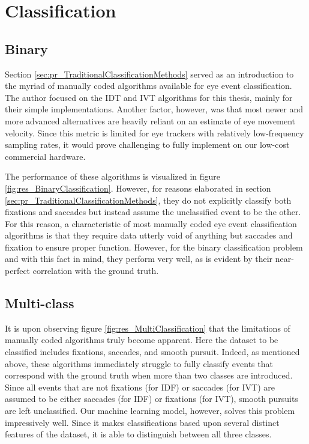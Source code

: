 \section{Classification} \label{sec:disc_Classification}


\subsection{Binary}
Section \ref{sec:pr_TraditionalClassificationMethods} served as an introduction to the myriad of manually coded algorithms available for eye event classification. The author focused on the IDT and IVT algorithms for this thesis, mainly for their simple implementations. Another factor, however, was that most newer and more advanced alternatives are heavily reliant on an estimate of eye movement velocity. Since this metric is limited for eye trackers with relatively low-frequency sampling rates, it would prove challenging to fully implement on our low-cost commercial hardware. 

The performance of these algorithms is visualized in figure \ref{fig:res_BinaryClassification}. However, for reasons elaborated in section \ref{sec:pr_TraditionalClassificationMethods}, they do not explicitly classify both fixations and saccades but instead assume the unclassified event to be the other. For this reason, a characteristic of most manually coded eye event classification algorithms is that they require data utterly void of anything but saccades and fixation to ensure proper function. However, for the binary classification problem and with this fact in mind, they perform very well, as is evident by their near-perfect correlation with the ground truth.

\subsection{Multi-class}

It is upon observing figure \ref{fig:res_MultiClassification} that the limitations of manually coded algorithms truly become apparent. Here the dataset to be classified includes fixations, saccades, and smooth pursuit. Indeed, as mentioned above, these algorithms immediately struggle to fully classify events that correspond with the ground truth when more than two classes are introduced. Since all events that are not fixations (for IDF) or saccades (for IVT) are assumed to be either saccades (for IDF) or fixations (for IVT), smooth pursuits are left unclassified. Our machine learning model, however, solves this problem impressively well. Since it makes classifications based upon several distinct features of the dataset, it is able to distinguish between all three classes.

